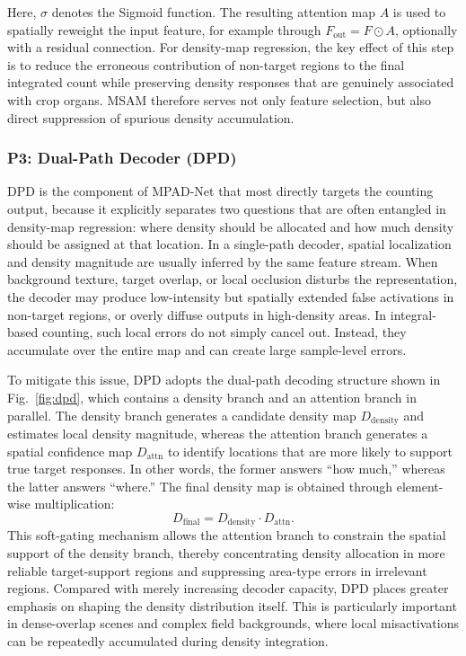 \documentclass[a4paper,fleqn]{cas-sc}
\begin{document}
	Here, $\sigma$ denotes the Sigmoid function. The resulting attention map $A$ is used to spatially reweight the input feature, for example through $F_{\mathrm{out}}=F\odot A$, optionally with a residual connection. For density-map regression, the key effect of this step is to reduce the erroneous contribution of non-target regions to the final integrated count while preserving density responses that are genuinely associated with crop organs. MSAM therefore serves not only feature selection, but also direct suppression of spurious density accumulation.
	
	\subsubsection{P3: Dual-Path Decoder (DPD)}
	
	DPD is the component of MPAD-Net that most directly targets the counting output, because it explicitly separates two questions that are often entangled in density-map regression: where density should be allocated and how much density should be assigned at that location. In a single-path decoder, spatial localization and density magnitude are usually inferred by the same feature stream. When background texture, target overlap, or local occlusion disturbs the representation, the decoder may produce low-intensity but spatially extended false activations in non-target regions, or overly diffuse outputs in high-density areas. In integral-based counting, such local errors do not simply cancel out. Instead, they accumulate over the entire map and can create large sample-level errors.
	
	To mitigate this issue, DPD adopts the dual-path decoding structure shown in Fig.~\ref{fig:dpd}, which contains a density branch and an attention branch in parallel. The density branch generates a candidate density map $D_{\mathrm{density}}$ and estimates local density magnitude, whereas the attention branch generates a spatial confidence map $D_{\mathrm{attn}}$ to identify locations that are more likely to support true target responses. In other words, the former answers ``how much,'' whereas the latter answers ``where.'' The final density map is obtained through element-wise multiplication:
	\begin{equation}
		D_{\mathrm{final}}=D_{\mathrm{density}}\cdot D_{\mathrm{attn}}.
		\label{eq:dpd_final}
	\end{equation}
	This soft-gating mechanism allows the attention branch to constrain the spatial support of the density branch, thereby concentrating density allocation in more reliable target-support regions and suppressing area-type errors in irrelevant regions. Compared with merely increasing decoder capacity, DPD places greater emphasis on shaping the density distribution itself. This is particularly important in dense-overlap scenes and complex field backgrounds, where local misactivations can be repeatedly accumulated during density integration.
	
\end{document}
